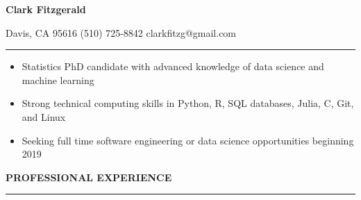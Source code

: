 \documentclass{article}
\begin{document}
\begin{center}
{\Large\bf Clark Fitzgerald} 
\end{center}

\hspace{4cm} Davis, CA 95616 \hspace{0.5cm} (510) 725-8842 \hspace{0.5cm} clarkfitzg@gmail.com 

\vspace{0.2cm}
\hrule
\vspace{0.2cm}

\begin{itemize}
  \setlength{\itemsep}{-1pt}

\item Statistics PhD candidate with advanced knowledge of data science
    and machine learning
    
\item Strong technical computing skills in Python, R, SQL databases, Julia,
    C, Git, and Linux

\item Seeking full time software engineering or data science opportunities
    beginning 2019

\end{itemize}

\vspace{0.1 cm}

\textbf{PROFESSIONAL EXPERIENCE}
\vspace{0.2 cm}
\hrule
\vspace{0.1cm}
\end{document}
